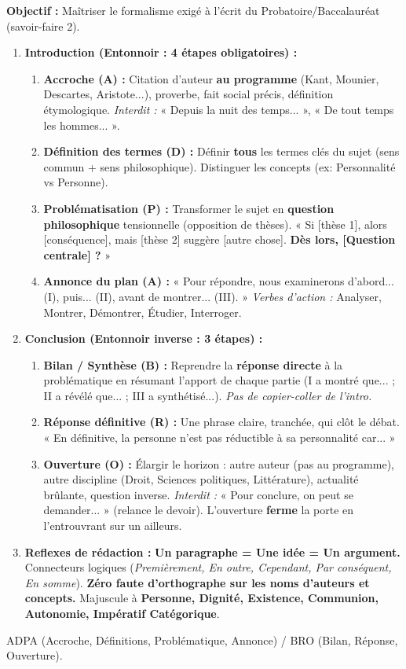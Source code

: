 \documentclass[11pt]{article}
\newcommand{\cle}[1]{{\popxbold\color{popdark}#1}}
\begin{document}
\begin{methode}
\textbf{Objectif :} Maîtriser le formalisme exigé à l'écrit du Probatoire/Baccalauréat (savoir-faire 2).
\begin{enumerate}
    \item \textbf{Introduction (Entonnoir : 4 étapes obligatoires) :}
    \begin{enumerate}
        \item \textbf{Accroche (A) :} Citation d'auteur \textbf{au programme} (Kant, Mounier, Descartes, Aristote...), proverbe, fait social précis, définition étymologique. \textit{Interdit :} « Depuis la nuit des temps... », « De tout temps les hommes... ».
        \item \textbf{Définition des termes (D) :} Définir \textbf{tous} les termes clés du sujet (sens commun + sens philosophique). Distinguer les concepts (ex: Personnalité vs Personne).
        \item \textbf{Problématisation (P) :} Transformer le sujet en \textbf{question philosophique} tensionnelle (opposition de thèses). « Si [thèse 1], alors [conséquence], mais [thèse 2] suggère [autre chose]. \textbf{Dès lors, [Question centrale] ?} »
        \item \textbf{Annonce du plan (A) :} « Pour répondre, nous examinerons d'abord... (I), puis... (II), avant de montrer... (III). » \textit{Verbes d'action :} Analyser, Montrer, Démontrer, Étudier, Interroger.
    \end{enumerate}
    \item \textbf{Conclusion (Entonnoir inverse : 3 étapes) :}
    \begin{enumerate}
        \item \textbf{Bilan / Synthèse (B) :} Reprendre la \textbf{réponse directe} à la problématique en résumant l'apport de chaque partie (I a montré que... ; II a révélé que... ; III a synthétisé...). \textit{Pas de copier-coller de l'intro.}
        \item \textbf{Réponse définitive (R) :} Une phrase claire, tranchée, qui clôt le débat. « En définitive, la personne n'est pas réductible à sa personnalité car... »
        \item \textbf{Ouverture (O) :} Élargir le horizon : autre auteur (pas au programme), autre discipline (Droit, Sciences politiques, Littérature), actualité brûlante, question inverse. \textit{Interdit :} « Pour conclure, on peut se demander... » (relance le devoir). L'ouverture \textbf{ferme} la porte en l'entrouvrant sur un ailleurs.
    \end{enumerate}
    \item \textbf{Reflexes de rédaction :} \textbf{Un paragraphe = Une idée = Un argument.} Connecteurs logiques (\emph{Premièrement, En outre, Cependant, Par conséquent, En somme}). \textbf{Zéro faute d'orthographe sur les noms d'auteurs et concepts.} Majuscule à \textbf{Personne, Dignité, Existence, Communion, Autonomie, Impératif Catégorique}.
\end{enumerate}
\cle{ADPA (Accroche, Définitions, Problématique, Annonce) / BRO (Bilan, Réponse, Ouverture).}
\end{methode}
\end{document}
